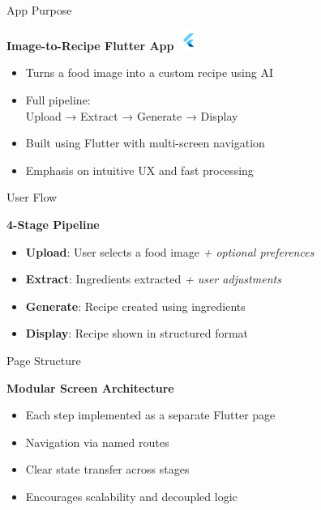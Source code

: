 \documentclass{beamer}
\begin{document}
\begin{frame}{App Purpose}
    \begin{block}{\textbf{Image-to-Recipe Flutter App  \includegraphics[width=0.05\textwidth]{pic1.png}}}
        \begin{itemize}
            \item Turns a food image into a custom recipe using AI
            \item Full pipeline: \\   \hspace{5mm} Upload → Extract → Generate → Display
            \item Built using Flutter with multi-screen navigation
            \item Emphasis on intuitive UX and fast processing
        \end{itemize}
    \end{block}
\end{frame}

\begin{frame}{User Flow}
    \begin{block}{\textbf{4-Stage Pipeline}}
        \begin{itemize}
            \item \textbf{Upload}: User selects a food image \textit{+ optional preferences}
            \item \textbf{Extract}: Ingredients extracted \textit{+ user adjustments} 
            \item \textbf{Generate}: Recipe created using ingredients
            \item \textbf{Display}: Recipe shown in structured format
        \end{itemize}
    \end{block}
\end{frame}

\begin{frame}{Page Structure}
    \begin{block}{\textbf{Modular Screen Architecture}}
        \begin{itemize}
            \item Each step implemented as a separate Flutter page
            \item Navigation via named routes
            \item Clear state transfer across stages
            \item Encourages scalability and decoupled logic
        \end{itemize}
    \end{block}
\end{frame}
\end{document}
